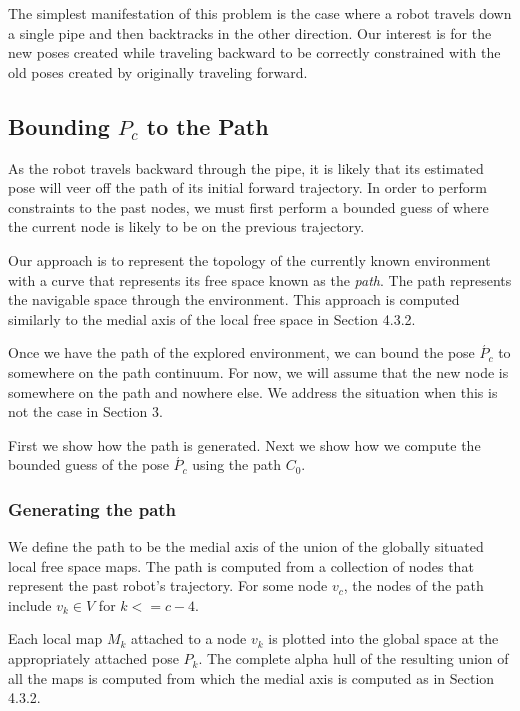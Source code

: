 

The simplest manifestation of this problem is the case where a robot travels down a single pipe and then backtracks in the other direction. Our interest is for the new poses created while traveling backward to be correctly constrained with the old poses created by originally traveling forward.

\subsection{Bounding $P_c$ to the Path}
\label{boundingp_ctothepath}

As the robot travels backward through the pipe, it is likely that its estimated pose will veer off the path of its initial forward trajectory. In order to perform constraints to the past nodes, we must first perform a bounded guess of where the current node is likely to be on the previous trajectory.

Our approach is to represent the topology of the currently known environment with a curve that represents its free space known as the \emph{path}. The path represents the navigable space through the environment. This approach is computed similarly to the medial axis of the local free space in Section 4.3.2.

Once we have the path of the explored environment, we can bound the pose $\acute{P_c}$ to somewhere on the path continuum. For now, we will assume that the new node is somewhere on the path and nowhere else. We address the situation when this is not the case in Section 3.

First we show how the path is generated. Next we show how we compute the bounded guess of the pose $\acute{P_c}$ using the path $C_0$.

\subsubsection{Generating the path}
\label{generatingthepath}

We define the path to be the medial axis of the union of the globally situated local free space maps. The path is computed from a collection of nodes that represent the past robot's trajectory. For some node $v_c$, the nodes of the path include $v_k \in V$ for $k <= c-4$.

Each local map $M_k$ attached to a node $v_k$ is plotted into the global space at the appropriately attached pose $P_k$. The complete alpha hull of the resulting union of all the maps is computed from which the medial axis is computed as in Section 4.3.2.

